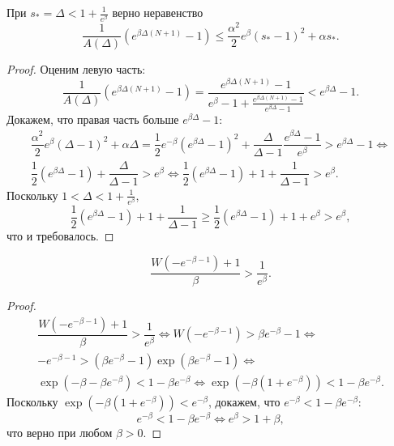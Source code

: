 \begin{proposition}
	При $s_* = \Delta < 1 + \frac{1}{e^{\beta}}$ верно неравенство
	$$
	\dfrac{1}{A(\Delta)}\left(e^{\beta\Delta(N + 1)} - 1\right) \leqslant \dfrac{\alpha^2}{2}e^{\beta}(s_* - 1)^2 + \alpha s_*.
	$$
\end{proposition}
\begin{proof}
	Оценим левую часть:
	\[
	\dfrac{1}{A(\Delta)}\left(e^{\beta\Delta(N + 1)} - 1\right) = \dfrac{e^{\beta\Delta(N + 1)} - 1}{e^{\beta} - 1 + \frac{e^{\beta\Delta(N + 1)} - 1}{e^{\beta\Delta} - 1}} < e^{\beta \Delta} - 1.
	\]
	Докажем, что правая часть больше $e^{\beta \Delta} - 1$:
	\begin{multline*}
		\dfrac{\alpha^2}{2}e^{\beta}(\Delta - 1)^2 + \alpha\Delta = \dfrac{1}{2}e^{-\beta}(e^{\beta\Delta} - 1)^2 + \dfrac{\Delta}{\Delta - 1}\dfrac{e^{\beta\Delta} - 1}{e^{\beta}} > e^{\beta \Delta} - 1 \Leftrightarrow\\
		\dfrac{1}{2}(e^{\beta\Delta} - 1) + \dfrac{\Delta}{\Delta - 1} > e^{\beta} \Leftrightarrow
		\dfrac{1}{2}(e^{\beta\Delta} - 1) + 1 + \dfrac{1}{\Delta - 1} > e^{\beta}.
	\end{multline*}
	Поскольку $1 < \Delta < 1 + \frac{1}{e^{\beta}}$,
	$$
	\dfrac{1}{2}(e^{\beta\Delta} - 1) + 1 + \dfrac{1}{\Delta - 1} \geqslant \dfrac{1}{2}(e^{\beta\Delta} - 1) + 1 + e^{\beta} > e^{\beta},
	$$
	что и требовалось.
\end{proof}

\begin{lemma}
	\label{lm:delta_min}
	$$\dfrac{W(-e^{-\beta - 1}) + 1}{\beta} > \dfrac{1}{e^{\beta}}.$$
\end{lemma}
\begin{proof}
	\begin{multline*}
		\dfrac{W(-e^{-\beta - 1}) + 1}{\beta} > \dfrac{1}{e^{\beta}} \Leftrightarrow
		W(-e^{-\beta - 1}) > \beta e^{-\beta} - 1 \Leftrightarrow \\
		-e^{-\beta - 1} > (\beta e^{-\beta} - 1)\exp(\beta e^{-\beta} - 1) \Leftrightarrow \\
		\exp(-\beta - \beta e^{-\beta}) < 
		1 - \beta e^{-\beta} \Leftrightarrow \exp(-\beta(1 + e^{-\beta})) < 1 - \beta e^{-\beta}.
	\end{multline*}
	Поскольку $\exp(-\beta(1 + e^{-\beta})) < e^{-\beta}$, докажем, что $e^{-\beta} < 1 - \beta e^{-\beta}$:
	\[
	e^{-\beta} < 1 - \beta e^{-\beta} \Leftrightarrow e^{\beta} > 1 + \beta,
	\]
	что верно при любом $\beta > 0$.
\end{proof}

